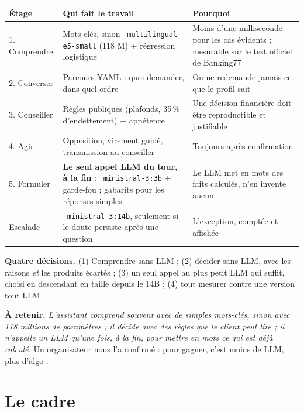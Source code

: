 \documentclass[11pt,a4paper]{article}
\DeclareRobustCommand{\f}[1]{{\texttt{\small
  \renewcommand{\_}{\char`\_\allowbreak}#1}}}
\begin{document}
\begin{center}\small
\begin{tabularx}{\textwidth}{@{}l L{5.6cm} Y@{}}
\toprule
\textbf{Étage} & \textbf{Qui fait le travail} & \textbf{Pourquoi} \\
. Comprendre & Mots-clés, sinon \f{multilingual-e5-small} (118 M) + régression logistique &
  Moins d'une milliseconde pour les cas évidents ; mesurable sur le test officiel de Banking77 \\
2. Converser & Parcours YAML : quoi demander, dans quel ordre & On ne redemande jamais ce que le
  profil sait \\
3. Conseiller & Règles publiques (plafonds, 35\,\% d'endettement) + appétence & Une décision
  financière doit être reproductible et justifiable \\
4. Agir & Opposition, virement guidé, transmission au conseiller & Toujours après confirmation \\
5. Formuler & \textbf{Le seul appel LLM du tour, à la fin} : \f{ministral-3:3b} + garde-fou ;
  gabarits pour les réponses simples & Le LLM met en mots des faits calculés, n'en invente aucun \\
Escalade & \f{ministral-3:14b}, seulement si le doute persiste après une question & L'exception,
  comptée et affichée \\
\bottomrule
\end{tabularx}
\end{center}

\textbf{Quatre décisions.} (1) Comprendre sans LLM ; (2) décider sans LLM, avec les raisons
\emph{et} les produits écartés ; (3) un seul appel au plus petit LLM qui suffit, choisi en
descendant en taille depuis le 14B ; (4) tout mesurer contre une version \og tout LLM \fg.

\begin{cle}
\textbf{À retenir.} \emph{L'assistant comprend souvent avec de simples mots-clés, sinon avec 118
millions de paramètres ; il décide avec des règles que le client peut lire ; il n'appelle un LLM
qu'une fois, à la fin, pour mettre en mots ce qui est déjà calculé.} Un organisateur nous l'a
confirmé : \og pour gagner, c'est moins de LLM, plus d'algo \fg.
\end{cle}

\section{Le cadre}
\end{document}

